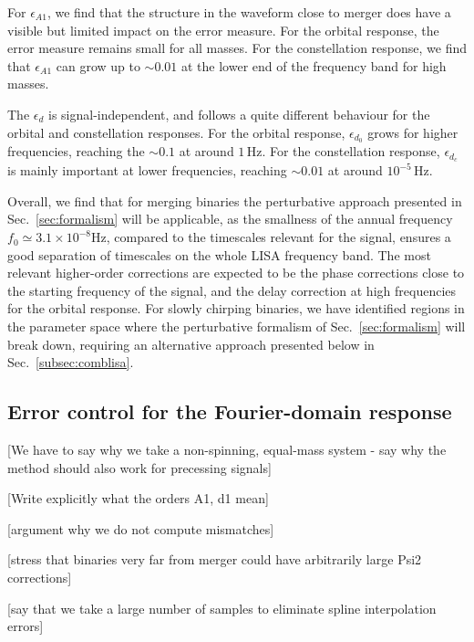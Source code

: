 \documentclass[aps,showpacs,twocolumn,
prd,superscriptaddress,nofootinbib]{revtex4-1}
\newcommand{\Hz}{\,\mathrm{Hz}}
\newcommand{\SM}[1]{{\color{Red} #1}}
\begin{document}
For $\epsilon_{A1}$, we find that the structure in the waveform close to merger does have a visible but limited impact on the error measure. For the orbital response, the error measure remains small for all masses. For the constellation response, we find that $\epsilon_{A1}$ can grow up to $\sim 0.01$ at the lower end of the frequency band for high masses.

The $\epsilon_{d}$ is signal-independent, and follows a quite different behaviour for the orbital and constellation responses. For the orbital response, $\epsilon_{d_{0}}$ grows for higher frequencies, reaching the $\sim 0.1$ at around $1\Hz$. For the constellation response, $\epsilon_{d_{c}}$ is mainly important at lower frequencies, reaching $\sim 0.01$ at around $10^{-5}\Hz$.

Overall, we find that for merging binaries the perturbative approach presented in Sec.~\ref{sec:formalism} will be applicable, as the smallness of the annual frequency $f_{0} \simeq 3.1\times10^{-8}\mathrm{Hz}$, compared to the timescales relevant for the signal, ensures a good separation of timescales on the whole LISA frequency band. The most relevant higher-order corrections are expected to be the phase corrections close to the starting frequency of the signal, and the delay correction at high frequencies for the orbital response. For slowly chirping binaries, we have identified regions in the parameter space where the perturbative formalism of Sec.~\ref{sec:formalism} will break down, requiring an alternative approach presented below in Sec.~\ref{subsec:comblisa}.


\subsection{Error control for the Fourier-domain response}
\label{subsec:errorsLISA}

\SM{[We have to say why we take a non-spinning, equal-mass system - say why the method should also work for precessing signals]}

\SM{[Write explicitly what the orders A1, d1 mean]}

\SM{[argument why we do not compute mismatches]}

\SM{[stress that binaries very far from merger could have arbitrarily large Psi2 corrections]}

\SM{[say that we take a large number of samples to eliminate spline interpolation errors]}
\end{document}
